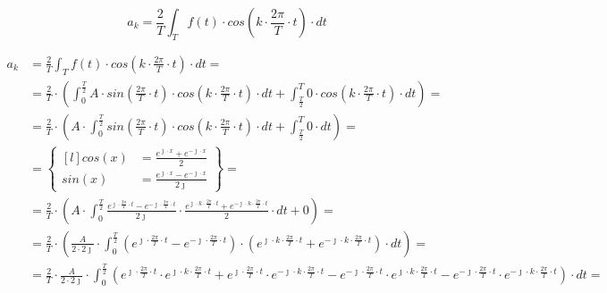\begin{task}
\begin{equation}
a_k=\frac{2}{T}\int_{T}f(t) \cdot cos\left( k \cdot \frac{2\pi}{T} \cdot t\right) \cdot dt
\end{equation}


\begin{align*}
a_k&=\frac{2}{T}\int_{T}f(t) \cdot cos\left( k \cdot \frac{2\pi}{T} \cdot t\right) \cdot dt=\\
&=\frac{2}{T}\cdot\left(\int_{0}^{\frac{T}{2}}A \cdot sin\left( \frac{2\pi}{T} \cdot t\right) \cdot cos\left( k \cdot \frac{2\pi}{T} \cdot t\right) \cdot dt+\int_{\frac{T}{2}}^{T} 0 \cdot cos\left( k \cdot \frac{2\pi}{T} \cdot t\right) \cdot dt\right)=\\
&=\frac{2}{T}\cdot\left(A \cdot \int_{0}^{\frac{T}{2}}sin\left( \frac{2\pi}{T} \cdot t\right) \cdot cos\left( k \cdot \frac{2\pi}{T} \cdot t\right) \cdot dt+\int_{\frac{T}{2}}^{T} 0 \cdot dt\right)=\\
&=\begin{Bmatrix*}[l]
cos\left(x\right)&=\frac{e^{\jmath \cdot x}+e^{-\jmath \cdot x}}{2}\\
sin\left(x\right)&=\frac{e^{\jmath \cdot x}-e^{-\jmath \cdot x}}{2 \jmath }
\end{Bmatrix*}=\\
&=\frac{2}{T}\cdot\left(A \cdot \int_{0}^{\frac{T}{2}} \frac{e^{\jmath \cdot \frac{2\pi}{T} \cdot t}-e^{-\jmath \cdot \frac{2\pi}{T} \cdot t}}{2\jmath} \cdot \frac{e^{\jmath \cdot k \cdot \frac{2\pi}{T} \cdot t}+e^{-\jmath \cdot k \cdot \frac{2\pi}{T} \cdot t}}{2} \cdot dt+0\right)=\\
&=\frac{2}{T}\cdot\left(\frac{A}{2\cdot 2\jmath} \cdot \int_{0}^{\frac{T}{2}} \left(e^{\jmath \cdot \frac{2\pi}{T} \cdot t}-e^{-\jmath \cdot \frac{2\pi}{T} \cdot t}\right)\cdot \left(e^{\jmath \cdot k \cdot \frac{2\pi}{T} \cdot t}+e^{-\jmath \cdot k \cdot \frac{2\pi}{T} \cdot t}\right) \cdot dt\right)=\\
&=\frac{2}{T} \cdot \frac{A}{2\cdot 2\jmath} \cdot \int_{0}^{\frac{T}{2}}
\left(e^{\jmath \cdot \frac{2\pi}{T} \cdot t} \cdot e^{\jmath \cdot k \cdot \frac{2\pi}{T} \cdot t} + e^{\jmath \cdot \frac{2\pi}{T} \cdot t} \cdot e^{-\jmath \cdot k \cdot \frac{2\pi}{T} \cdot t} - e^{-\jmath \cdot \frac{2\pi}{T} \cdot t} \cdot e^{\jmath \cdot k \cdot \frac{2\pi}{T} \cdot t} - e^{-\jmath \cdot \frac{2\pi}{T} \cdot t} \cdot e^{-\jmath \cdot k \cdot \frac{2\pi}{T} \cdot t} \right) \cdot dt=\\

\end{align*}
\end{task}
